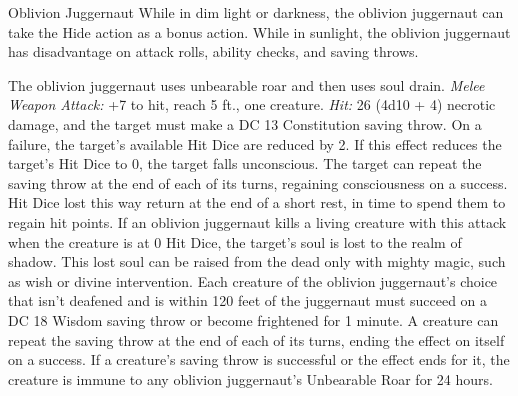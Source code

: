 \documentclass[10pt,a4paper,twoside,twocolumn,openany,bg=print,nodeprecatedcode]{dndbook}
\begin{document}
\begin{DndMonster}[float*=t]{Oblivion Juggernaut}
\DndMonsterBasics[
armor-class = {12},
hit-points = {\DndDice{10d12 + 20}},
speed = {40 ft.}
]
\DndMonsterAbilityScores[
 str = 18,
 dex = 14,
 con = 15,
 int = 10,
 wis = 10,
 cha = 8
]
\DndMonsterDetails[
skills = {Stealth +5},
damage-vulnerabilities = {radiant},
damage-resistances = {cold; bludgeoning, piercing, slashing from nonmagical attacks},
damage-immunities = {necrotic, poison},
senses = {darkvision 60 ft., passive perception 10},
challenge = 8,
]
While in dim light or darkness, the oblivion juggernaut can take the Hide action as a bonus action.
While in sunlight, the oblivion juggernaut has disadvantage on attack rolls, ability checks, and saving throws.
\par
{}
The oblivion juggernaut uses unbearable roar and then uses soul drain.
\textsl{Melee Weapon Attack:} +7 to hit, reach 5 ft., one creature. \textsl{Hit:} 26 (4d10 + 4) necrotic damage, and the target must make a DC 13 Constitution saving throw. On a failure, the target's available Hit Dice are reduced by 2. If this effect reduces the target's Hit Dice to 0, the target falls unconscious. The target can repeat the saving throw at the end of each of its turns, regaining consciousness on a success. Hit Dice lost this way return at the end of a short rest, in time to spend them to regain hit points.
If an oblivion juggernaut kills a living creature with this attack when the creature is at 0 Hit Dice, the target's soul is lost to the realm of shadow. This lost soul can be raised from the dead only with mighty magic, such as wish or divine intervention.
Each creature of the oblivion juggernaut's choice that isn't deafened and is within 120 feet of the juggernaut must succeed on a DC 18 Wisdom saving throw or become frightened for 1 minute. A creature can repeat the saving throw at the end of each of its turns, ending the effect on itself on a success. If a creature's saving throw is successful or the effect ends for it, the creature is immune to any oblivion juggernaut's Unbearable Roar for 24 hours.
\end{DndMonster}
\end{document}
